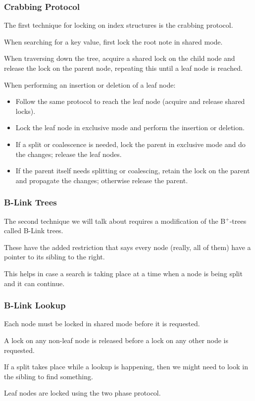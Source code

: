 \begin{frame}
\frametitle{Crabbing Protocol}

The first technique for locking on index structures is the \alert{crabbing protocol}.

When searching for a key value, first lock the root note in shared mode. 

When traversing down the tree, acquire a shared lock on the child node and release the lock on the parent node, repeating this until a leaf node is reached.

When performing an insertion or deletion of a leaf node:
\begin{itemize}
	\item Follow the same protocol to reach the leaf node (acquire and release shared locks).
	\item Lock the leaf node in exclusive mode and perform the insertion or deletion.
	\item If a split or coalescence is needed, lock the parent in exclusive mode and do the changes; release the leaf nodes.
	\item If the parent itself needs splitting or coalescing, retain the lock on the parent and propagate the changes; otherwise release the parent.
\end{itemize}


\end{frame}

\begin{frame}
\frametitle{B-Link Trees}
The second technique we will talk about requires a modification of the B$^{+}$-trees called \alert{B-Link} trees. 

These have the added restriction that says every node (really, all of them) have a pointer to its sibling to the right. 

This helps in case a search is taking place at a time when a node is being split and it can continue. 


\end{frame}

\begin{frame}
\frametitle{B-Link Lookup}

Each node must be locked in shared mode before it is requested. 

A lock on any non-leaf node is released before a lock on any other node is requested. 

If a split takes place while a lookup is happening, then we might need to look in the sibling to find something. 

Leaf nodes are locked using the two phase protocol.

\end{frame}

